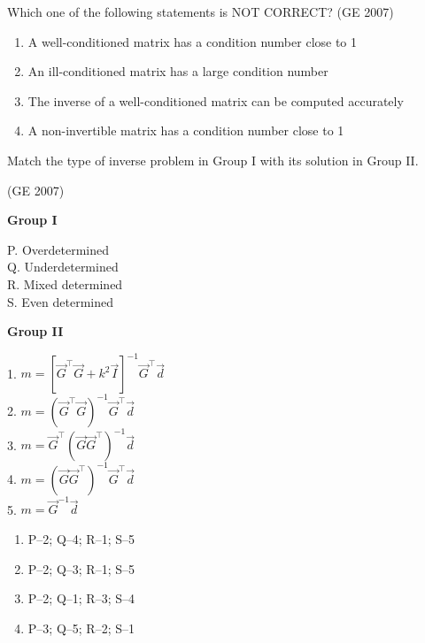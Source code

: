 \item Which one of the following statements is NOT CORRECT?
\hfill	(GE 2007)
\begin{enumerate}
\item A well-conditioned matrix has a condition number close to 1  
\item An ill-conditioned matrix has a large condition number  
\item The inverse of a well-conditioned matrix can be computed accurately  
\item A non-invertible matrix has a condition number close to 1  
\end{enumerate}

\item Match the type of inverse problem in Group I with its solution in Group II.

	\hfill (GE 2007)
\begin{multicols}{2}
\textbf{Group I}  
\begin{flushleft}
P. Overdetermined\\
Q. Underdetermined\\
R. Mixed determined\\
S. Even determined
\end{flushleft}

\columnbreak

\textbf{Group II}  
\begin{flushleft}
1. \( m = [\vec{G}^{\top} \vec{G} + k^2 \vec{I}]^{-1} \vec{G}^{\top} \vec{d} \)\\
2. \( m = (\vec{G}^{\top} \vec{G})^{-1} \vec{G}^{\top} \vec{d} \)\\
3. \( m = \vec{G}^{\top} (\vec{G} \vec{G}^{\top})^{-1} \vec{d} \)\\
4. \( m = (\vec{G} \vec{G}^{\top})^{-1} \vec{G}^{\top} \vec{d} \)\\
5. \( m = \vec{G}^{-1} \vec{d} \)
\end{flushleft}
\end{multicols}

\begin{multicols}{2}
\begin{enumerate}
\item P--2; Q--4; R--1; S--5  
\item P--2; Q--3; R--1; S--5  
\item P--2; Q--1; R--3; S--4  
\item P--3; Q--5; R--2; S--1  
\end{enumerate}
\end{multicols}

